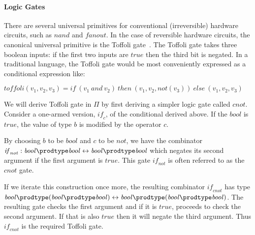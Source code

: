 \paragraph*{Logic Gates}
There are several universal primitives for conventional (irreversible)
hardware circuits, such as \ensuremath{\mathit{nand}} and \ensuremath{\mathit{fanout}}. In the case
of reversible hardware circuits, the canonical universal primitive is
the Toffoli gate~\cite{Toffoli:1980}. The Toffoli gate takes three
boolean inputs: if the first two inputs are \ensuremath{\mathit{true}} then the third
bit is negated. In a traditional language, the Toffoli gate would be
most conveniently expressed as a conditional expression like:

\noindent
\ensuremath{ \mathit{toffoli}(v_1,v_2,v_3) = \mathit{if} ~(v_1 ~\mathit{and} ~v_2) ~\mathit{then} ~(v_1, v_2, \mathit{not}(v_3)) ~\mathit{else} ~(v_1, v_2, v_3)}

We will derive Toffoli gate in \ensuremath{\Pi } by first deriving a simpler
logic gate called \ensuremath{\mathit{cnot}}.  Consider a one-armed version, \ensuremath{\mathit{if}_c},
of the conditional derived above. If the \ensuremath{\mathit{bool}} is
\ensuremath{\mathit{true}}, the value of type \ensuremath{b} is modified by the operator \ensuremath{c}.

\begin{center}
\scalebox{1.5}{
}
\end{center}


By choosing \ensuremath{b} to be \ensuremath{\mathit{bool}} and \ensuremath{c} to be \ensuremath{\mathit{not}}, we have the
combinator \ensuremath{\mathit{if}_{\mathit{not}} : \mathit{bool} {\prodtype}  \mathit{bool}\leftrightarrow \mathit{bool} {\prodtype}  \mathit{bool}} which negates its
second argument if the first argument is \ensuremath{\mathit{true}}. This gate
\ensuremath{\mathit{if}_{\mathit{not}}} is often referred to as the \ensuremath{\mathit{cnot}} gate\cite{Toffoli:1980}.

If we iterate this construction once more, the resulting combinator
\ensuremath{\mathit{if}_{\mathit{cnot}}} has type \ensuremath{\mathit{bool} {\prodtype}  (\mathit{bool} {\prodtype}  \mathit{bool})\leftrightarrow \mathit{bool} {\prodtype}  (\mathit{bool} {\prodtype}  \mathit{bool})}. The
resulting gate checks the first argument and if it is \ensuremath{\mathit{true}},
proceeds to check the second argument. If that is also \ensuremath{\mathit{true}} then
it will negate the third argument. Thus \ensuremath{\mathit{if}_{\mathit{cnot}}} is the required
Toffoli gate.

